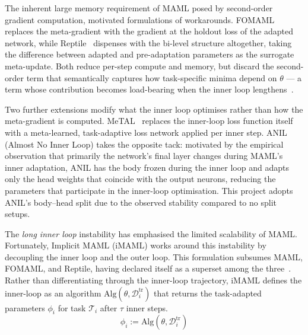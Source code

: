 \documentclass[10pt,journal,compsoc]{IEEEtran}
\begin{document}
The inherent large memory requirement of MAML posed by second-order gradient
computation, motivated formulations of workarounds. FOMAML~\cite{finn2017}
replaces the meta-gradient with the gradient at the holdout loss of the adapted
network, while Reptile~\cite{nichol2018} dispenses with the bi-level
structure altogether, taking the difference between adapted and pre-adaptation
parameters as the surrogate meta-update. Both reduce per-step compute and
memory, but discard the second-order term that semantically captures how
task-specific minima depend on $\theta$ --- a term whose contribution becomes
load-bearing when the inner loop lengthens~\cite{nichol2018}.

Two further extensions modify what the inner loop optimises rather than how the
meta-gradient is computed. MeTAL~\cite{baik2021} replaces the inner-loop
loss function itself with a meta-learned, task-adaptive loss network applied
per inner step. ANIL~\cite{raghu2020} (Almost No Inner Loop) takes the
opposite tack: motivated by the empirical observation that primarily the
network's final layer changes during MAML's inner adaptation, ANIL has the body
frozen during the inner loop and adapts only the head weights that coincide with
the output neurons, reducing the parameters that participate in the inner-loop
optimisation. This project adopts ANIL's body--head split due to the observed
stability compared to no split setups.

The \emph{long inner loop} instability has emphasised the limited scalability
of MAML. Fortunately, Implicit MAML (iMAML) \cite{rajeswaran2019} works around
this instability by decoupling the inner loop and the outer loop. This
formulation subsumes MAML, FOMAML, and Reptile, having declared itself as a
superset among the three~\cite[Appendix~A]{rajeswaran2019}. Rather than
differentiating through the inner-loop trajectory, iMAML defines the inner-loop
as an algorithm $\text{Alg}(\theta, \mathcal{D}^{\text{tr}}_i)$ that returns
the task-adapted parameters $\phi_i$ for task $\mathcal{T}_i$ after $\tau$
inner steps.
\begin{equation}\label{maml_inner}
\phi_i := \text{Alg}(\theta, \mathcal{D}^{\text{tr}}_i)
\end{equation}
\end{document}

